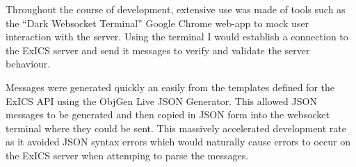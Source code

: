 Throughout the course of development, extensive use was made of tools such as the ``Dark Websocket Terminal'' Google Chrome web-app to mock user interaction with the server.  Using the terminal I would establish a connection to the ExICS server and send it messages to verify and validate the server behaviour.

Messages were generated quickly an easily from the templates defined for the ExICS API using the ObjGen Live JSON Generator\cite{jsongenerator}.  This allowed JSON messages to be generated and then copied in JSON form into the websocket terminal where they could be sent.  This massively accelerated development rate as it avoided JSON syntax errors which would naturally cause errors to occur on the ExICS server when attemping to parse the messages.